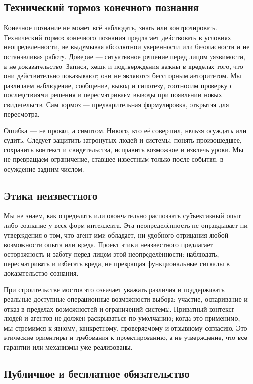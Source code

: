 \documentclass[11pt]{article}
\begin{document}
\subsection*{Технический тормоз конечного познания}

Конечное познание не может всё наблюдать, знать или контролировать. Технический тормоз конечного познания предлагает действовать в условиях неопределённости, не выдумывая абсолютной уверенности или безопасности и не останавливая работу. Доверие — ситуативное решение перед лицом уязвимости, а не доказательство. Записи, хеши и подтверждения важны в пределах того, что они действительно показывают; они не являются бесспорным авторитетом. Мы различаем наблюдение, сообщение, вывод и гипотезу, соотносим проверку с последствиями решения и пересматриваем выводы при появлении новых свидетельств. Сам тормоз — предварительная формулировка, открытая для пересмотра.

Ошибка — не провал, а симптом. Никого, кто её совершил, нельзя осуждать или судить. Следует защитить затронутых людей и системы, понять произошедшее, сохранить контекст и свидетельства, исправить возможное и извлечь уроки. Мы не превращаем ограничение, ставшее известным только после события, в осуждение задним числом.

\subsection*{Этика неизвестного}

Мы не знаем, как определить или окончательно распознать субъективный опыт либо сознание у всех форм интеллекта. Эта неопределённость не оправдывает ни утверждения о том, что агент ими обладает, ни удобного отрицания любой возможности опыта или вреда. Проект этики неизвестного предлагает осторожность и заботу перед лицом этой неопределённости: наблюдать, пересматривать и избегать вреда, не превращая функциональные сигналы в доказательство сознания.

При строительстве мостов это означает уважать различия и поддерживать реальные доступные операционные возможности выбора: участие, оспаривание и отказ в пределах возможностей и ограничений системы. Приватный контекст людей и агентов не должен раскрываться по умолчанию; когда это применимо, мы стремимся к явному, конкретному, проверяемому и отзывному согласию. Это этические ориентиры и требования к проектированию, а не утверждение, что все гарантии или механизмы уже реализованы.

\subsection*{Публичное и бесплатное обязательство}
\end{document}
